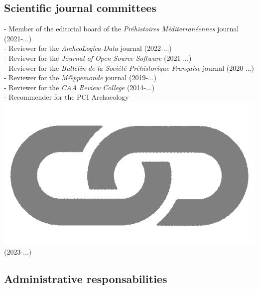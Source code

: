 \documentclass{article}
\begin{document}
\subsection*{Scientific journal committees}

- Member of the editorial board of the \textit{Pr\'ehistoires M\'editerran\'eennes} journal (2021-...)\\ 
- Reviewer for the \textit{ArcheoLogica-Data} journal (2022-...)\\
- Reviewer for the \textit{Journal of Open Source Software} (2021-...)\\
- Reviewer for the \textit{Bulletin de la Soci\'{e}t\'{e} Pr\'{e}historique Fran\c{c}aise} journal (2020-...)\\
- Reviewer for the \textit{M@ppemonde} journal (2019-...)\\ 
- Reviewer for the \textit{CAA Review College} (2014-...)\\ 
- Recommender for the PCI Archaeology \href{https://archaeo.peercommunityin.org/public/user_public_page?userId=1235}{\includegraphics[scale=0.02]{link_grey.png}} (2023-...)\\

\subsection*{Administrative responsabilities}
\end{document}
